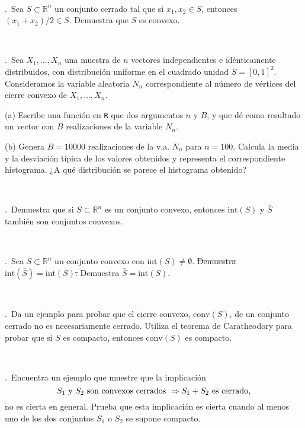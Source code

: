 \documentclass[12pt,a4paper,twoside]{article}
\newcounter{problem} \setcounter{problem}{1}
\newcommand{\ex}{\noindent {\sf \bf \theproblem}\addtocounter{problem}{1}.\ }
\begin{document}
\

\ex Sea $S\subset \mathbb{R}^n$ un conjunto cerrado tal que si $x_1,x_2\in S$, entonces $(x_1+x_2)/2\in S$. Demuestra que $S$ es convexo.


\

\ex Sea $X_1,\ldots, X_n$ una muestra de $n$ vectores independientes e idénticamente distribuidos, con distribución uniforme en el cuadrado unidad $S=[0,1]^2$. Consideramos la variable aleatoria $N_n$ correspondiente al número de vértices del cierre convexo de $X_1,\ldots, X_n$. 
\begin{compactitem}
\item[(a)] Escribe una función  en {\tt R} que  dos argumentos $n$ y $B$, y que dé como resultado un vector con $B$ realizaciones de la variable $N_n$.  
\item[(b)] Genera $B=10000$ realizaciones de la v.a. $N_n$ para $n=100$. Calcula la media y la desviación típica de los valores obtenidos y representa el correspondiente  histograma. ¿A qué distribución se parece el histograma obtenido?
\end{compactitem}


\

\ex Demuestra que si $S\subset \mathbb{R}^n$ es un conjunto convexo, entonces  $\mbox{int}(S)$ y $\bar{S}$ también son conjuntos convexos.



\

\ex Sea $S\subset \mathbb{R}^n$  un conjunto convexo con $\mbox{int}(S)\neq \emptyset$. \sout{Demuestra $\mbox{int}(\bar{S})=\mbox{int}(S)$.} Demuestra $\bar{S}=\overline{\mbox{int}(S)}$.


\

\ex Da un ejemplo para probar que el cierre convexo, $\mbox{conv}(S)$, de un conjunto cerrado no es necesariamente cerrado. Utiliza el teorema de Caratheodory para probar que si $S$ es compacto, entonces $\mbox{conv}(S)$ es compacto.



\

\ex  Encuentra un ejemplo que muestre que la implicaci{\'o}n
$$
S_1 \hbox{ y } S_2 \hbox{ son convexos cerrados } \Rightarrow
S_1+S_2 \hbox { es cerrado,}
$$
no es cierta en general. Prueba que esta  implicaci{\'o}n es cierta
cuando al menos uno de los dos conjuntos $S_1$ o $S_2$ se supone
compacto.


\
\end{document}
